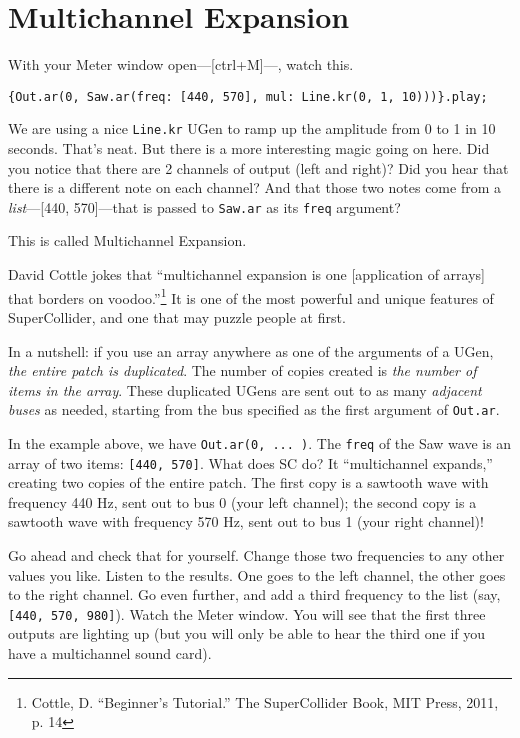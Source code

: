 \section{Multichannel Expansion}

With your Meter window open---[ctrl+M]---, watch this.

\begin{lstlisting}[style=SuperCollider-IDE, basicstyle=\scttfamily\footnotesize]
{Out.ar(0, Saw.ar(freq: [440, 570], mul: Line.kr(0, 1, 10)))}.play;
\end{lstlisting}

We are using a nice \texttt{Line.kr} UGen to ramp up the amplitude from 0 to 1 in 10 seconds. That's neat. But there is a more interesting magic going on here. Did you notice that there are 2 channels of output (left and right)? Did you hear that there is a different note on each channel? And that those two notes come from a \emph{list}---[440, 570]---that is passed to \texttt{Saw.ar} as its \texttt{freq} argument?

This is called Multichannel Expansion.

David Cottle jokes that ``multichannel expansion is one [application of arrays] that borders on voodoo.''\footnote{Cottle, D. ``Beginner's Tutorial.'' The SuperCollider Book, MIT Press, 2011, p. 14} It is one of the most powerful and unique features of SuperCollider, and one that may puzzle people at first.

In a nutshell: if you use an array anywhere as one of the arguments of a UGen, \emph{the entire patch is duplicated}. The number of copies created is \textit{the number of items in the array}. These duplicated UGens are sent out to as many \textit{adjacent buses} as needed, starting from the bus specified as the first argument of \texttt{Out.ar}.

In the example above, we have \texttt{Out.ar(0, ... )}. The \texttt{freq} of the Saw wave is an array of two items: \texttt{[440, 570]}. What does SC do? It ``multichannel expands,'' creating two copies of the entire patch. The first copy is a sawtooth wave with frequency 440 Hz, sent out to bus 0 (your left channel); the second copy is a sawtooth wave with frequency 570 Hz, sent out to bus 1 (your right channel)!

Go ahead and check that for yourself. Change those two frequencies to any other values you like. Listen to the results. One goes to the left channel, the other goes to the right channel. Go even further, and add a third frequency to the list (say, \texttt{[440, 570, 980]}). Watch the Meter window. You will see that the first three outputs are lighting up (but you will only be able to hear the third one if you have a multichannel sound card).

